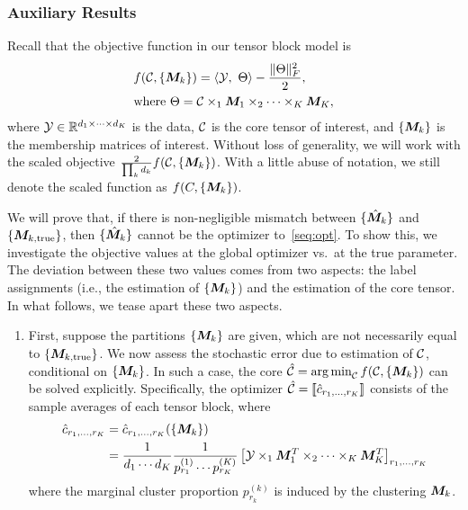 \documentclass{article}
\begin{document}
\begin{appendices}
\subsubsection{Auxiliary Results}

Recall that the objective function in our tensor block model is 
\begin{align}\label{seq:opt}
&f(\mathcal{C}, \{ \bm M_k\})=\langle \mathcal{Y},\ \Theta\rangle -\frac{\lVert\Theta\rVert_F^2}{2},\\
&\text{where } \Theta=\mathcal{C}\times_1\bm M_1\times_2\cdots\times_K \bm M_K,
\end{align}
where $\mathcal{Y}\in\mathbb{R}^{d_1\times \cdots \times d_K}$ is the data, $\mathcal{C}$ is the core tensor of interest, and $\{\bm M_k\}$ is the membership matrices of interest. Without loss of generality, we will work with the scaled objective ${2\over \prod_k d_k}f(\mathcal{C}, \{\bm M_k\})$. With a little abuse of notation, we still denote the scaled function as $f(C,\{\bm M_k\})$.

We will prove that, if there is non-negligible mismatch between $\{\hat{ \bm M}_k\}$ and $\{\bm M_{k,\text{true}}\}$, then $\{\hat{ \bm M}_k\}$ cannot be the optimizer to~\eqref{seq:opt}. To show this, we investigate the objective values at the global optimizer vs.\ at the true parameter. The deviation between these two values comes from two aspects: the label assignments (i.e., the estimation of $\{\bm M_k\}$) and the estimation of the core tensor. In what follows, we tease apart these two aspects.
 
 \begin{enumerate}
\item First, suppose the partitions $\{\bm M_k\}$ are given, which are not necessarily equal to $\{\bm M_{k,\text{true}}\}$. We now assess the stochastic error due to estimation of $\mathcal{C}$, conditional on $\{\bm M_k\}$. In such a case, the core $\hat {\mathcal{C}} = \operatorname*{arg\,min}_{\mathcal{C}} f(\mathcal{C},\{\bm M_k\})$ can be solved explicitly. Specifically, the optimizer $\hat {\mathcal{C}}=\llbracket \hat c_{r_1,\ldots,r_K} \rrbracket$ consists of the sample averages of each tensor block, where
\begin{align}\label{eq:core}
\displaystyle \hat c_{r_1,\ldots,r_K}&=\hat c_{r_1,\ldots,r_K}(\{\bm M_k\})\\
&= {1\over d_1\cdots d_K}\frac{1}{p_{r_1}^{(1)}\cdots p_{r_K}^{(K)}}\left[\mathcal{Y}\times_1\bm M^T_1\times_2\cdots\times_K \bm M^T_K\right]_{r_1,\ldots,r_K}
\end{align}
where the marginal cluster proportion $p^{(k)}_{r_k}$ is induced by the clustering $\bm M_k$. 


\end{enumerate}
\end{appendices}
\end{document}
